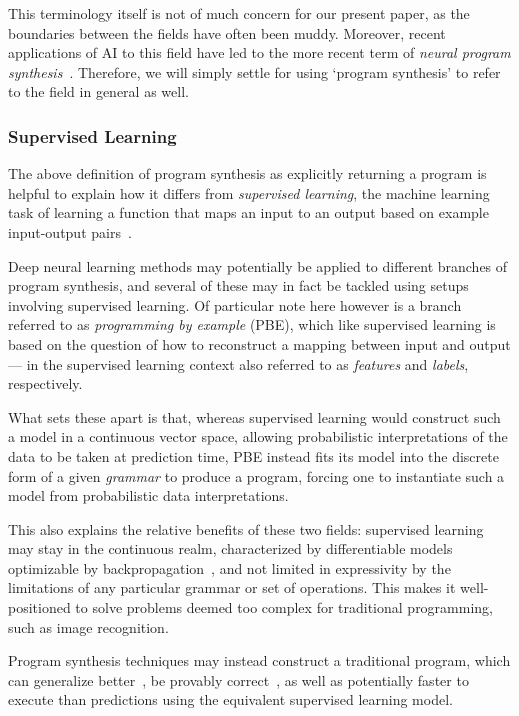 \documentclass{article}
\begin{document}
This terminology itself is not of much concern for our present paper, as the boundaries between the fields have often been muddy.
Moreover, recent applications of AI to this field have led to the more recent term of \emph{neural program synthesis}~\citep{nps}. Therefore, we will simply settle for using `program synthesis' to refer to the field in general as well.

\subsubsection{Supervised Learning}

The above definition of program synthesis as explicitly returning a program
is helpful to explain how it differs from \emph{supervised learning},
the machine learning task of learning a function that maps an input to an output based on example input-output pairs~\citep{russell2002artificial}.

Deep neural learning methods may potentially be applied to different branches of program synthesis,
and several of these may in fact be tackled using setups involving supervised learning.
Of particular note here however is a branch referred to as \emph{programming by example} (PBE),
which like supervised learning is based on the question of how to reconstruct a mapping between input and output --- in the supervised learning context also referred to as \emph{features} and \emph{labels}, respectively.

What sets these apart is that,
whereas supervised learning would construct such a model in a continuous vector space,
allowing probabilistic interpretations of the data to be taken at prediction time,
PBE instead fits its model into the discrete form of a given \emph{grammar} to produce a program,
forcing one to instantiate such a model from probabilistic data interpretations.

This also explains the relative benefits of these two fields:
supervised learning may stay in the continuous realm,
characterized by differentiable models optimizable by backpropagation~\citep{backproprnn},
and not limited in expressivity by the limitations of any particular grammar or set of operations.
This makes it well-positioned to solve problems deemed too complex for traditional programming, such as image recognition.

Program synthesis techniques may instead construct a traditional program,
which
can generalize better~\citep{nps}, be provably correct~\citep{nps},
as well as potentially faster to execute than predictions using the equivalent supervised learning model.
\end{document}
